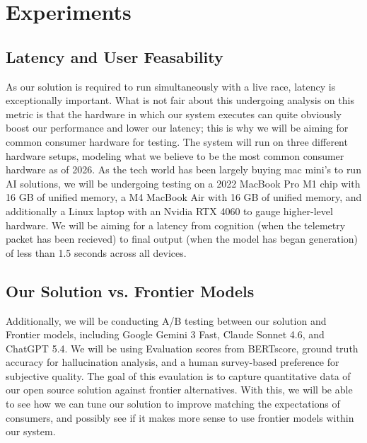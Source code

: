 \section{Experiments}

\subsection{Latency and User Feasability}
As our solution is required to run simultaneously with a live race, latency is exceptionally important. What is not fair about this undergoing analysis on this metric is that the hardware in which our system executes can quite obviously boost our performance and lower our latency; this is why we will be aiming for common consumer hardware for testing. The system will run on three different hardware setups, modeling what we believe to be the most common consumer hardware as of 2026. As the tech world has been largely buying mac mini's to run AI solutions, we will be undergoing testing on a 2022 MacBook Pro M1 chip with 16 GB of unified memory, a M4 MacBook Air with 16 GB of unified memory, and additionally a Linux laptop with an Nvidia RTX 4060 to gauge higher-level hardware. We will be aiming for a latency from cognition (when the telemetry packet has been recieved) to final output (when the model has began generation) of less than 1.5 seconds across all devices. \subsection{Our Solution vs. Frontier Models}
Additionally, we will be conducting A/B testing between our solution and Frontier models, including Google Gemini 3 Fast, Claude Sonnet 4.6, and ChatGPT 5.4. We will be using Evaluation scores from BERTscore, ground truth accuracy for hallucination analysis, and a human survey-based preference for subjective quality. The goal of this evaulation is to capture quantitative data of our open source solution against frontier alternatives. With this, we will be able to see how we can tune our solution to improve matching the expectations of consumers, and possibly see if it makes more sense to use frontier models within our system.